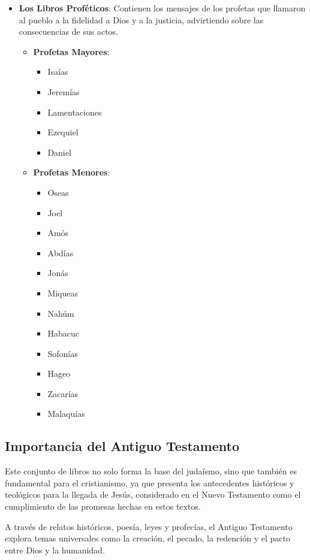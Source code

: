 \documentclass[oneside,  10pt]{book}
\begin{document}
\begin{itemize}
	\item \textbf{Los Libros Proféticos}: Contienen los mensajes de los profetas que llamaron al pueblo a la fidelidad a Dios y a la justicia, advirtiendo sobre las consecuencias de sus actos.
	\begin{itemize}
		\item \textbf{Profetas Mayores}:
		\begin{itemize}
			\item Isaías
			\item Jeremías
			\item Lamentaciones
			\item Ezequiel
			\item Daniel
		\end{itemize}
		\item \textbf{Profetas Menores}:
		\begin{itemize}
			\item Oseas
			\item Joel
			\item Amós
			\item Abdías
			\item Jonás
			\item Miqueas
			\item Nahúm
			\item Habacuc
			\item Sofonías
			\item Hageo
			\item Zacarías
			\item Malaquías
		\end{itemize}
	\end{itemize}
\end{itemize}

\subsection*{Importancia del Antiguo Testamento}

Este conjunto de libros no solo forma la base del judaísmo, sino que también es fundamental para el cristianismo, ya que presenta los antecedentes históricos y teológicos para la llegada de Jesús, considerado en el Nuevo Testamento como el cumplimiento de las promesas hechas en estos textos.

A través de relatos históricos, poesía, leyes y profecías, el Antiguo Testamento explora temas universales como la creación, el pecado, la redención y el pacto entre Dios y la humanidad.

	
	
\end{document}
